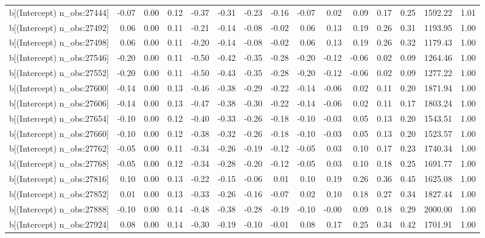 \begin{table}[ht]
\begin{tabular}{rrrrrrrrrrrrrrr}
  b[(Intercept) n\_obs:27444] & -0.07 & 0.00 & 0.12 & -0.37 & -0.31 & -0.23 & -0.16 & -0.07 & 0.02 & 0.09 & 0.17 & 0.25 & 1592.22 & 1.01 \\ 
  b[(Intercept) n\_obs:27492] & 0.06 & 0.00 & 0.11 & -0.21 & -0.14 & -0.08 & -0.02 & 0.06 & 0.13 & 0.19 & 0.26 & 0.31 & 1193.95 & 1.00 \\ 
  b[(Intercept) n\_obs:27498] & 0.06 & 0.00 & 0.11 & -0.20 & -0.14 & -0.08 & -0.02 & 0.06 & 0.13 & 0.19 & 0.26 & 0.32 & 1179.43 & 1.00 \\ 
  b[(Intercept) n\_obs:27546] & -0.20 & 0.00 & 0.11 & -0.50 & -0.42 & -0.35 & -0.28 & -0.20 & -0.12 & -0.06 & 0.02 & 0.09 & 1264.46 & 1.00 \\ 
  b[(Intercept) n\_obs:27552] & -0.20 & 0.00 & 0.11 & -0.50 & -0.43 & -0.35 & -0.28 & -0.20 & -0.12 & -0.06 & 0.02 & 0.09 & 1277.22 & 1.00 \\ 
  b[(Intercept) n\_obs:27600] & -0.14 & 0.00 & 0.13 & -0.46 & -0.38 & -0.29 & -0.22 & -0.14 & -0.06 & 0.02 & 0.11 & 0.20 & 1871.94 & 1.00 \\ 
  b[(Intercept) n\_obs:27606] & -0.14 & 0.00 & 0.13 & -0.47 & -0.38 & -0.30 & -0.22 & -0.14 & -0.06 & 0.02 & 0.11 & 0.17 & 1803.24 & 1.00 \\ 
  b[(Intercept) n\_obs:27654] & -0.10 & 0.00 & 0.12 & -0.40 & -0.33 & -0.26 & -0.18 & -0.10 & -0.03 & 0.05 & 0.13 & 0.20 & 1543.51 & 1.00 \\ 
  b[(Intercept) n\_obs:27660] & -0.10 & 0.00 & 0.12 & -0.38 & -0.32 & -0.26 & -0.18 & -0.10 & -0.03 & 0.05 & 0.13 & 0.20 & 1523.57 & 1.00 \\ 
  b[(Intercept) n\_obs:27762] & -0.05 & 0.00 & 0.11 & -0.34 & -0.26 & -0.19 & -0.12 & -0.05 & 0.03 & 0.10 & 0.17 & 0.23 & 1740.34 & 1.00 \\ 
  b[(Intercept) n\_obs:27768] & -0.05 & 0.00 & 0.12 & -0.34 & -0.28 & -0.20 & -0.12 & -0.05 & 0.03 & 0.10 & 0.18 & 0.25 & 1691.77 & 1.00 \\ 
  b[(Intercept) n\_obs:27816] & 0.10 & 0.00 & 0.13 & -0.22 & -0.15 & -0.06 & 0.01 & 0.10 & 0.19 & 0.26 & 0.36 & 0.45 & 1625.08 & 1.00 \\ 
  b[(Intercept) n\_obs:27852] & 0.01 & 0.00 & 0.13 & -0.33 & -0.26 & -0.16 & -0.07 & 0.02 & 0.10 & 0.18 & 0.27 & 0.34 & 1827.44 & 1.00 \\ 
  b[(Intercept) n\_obs:27888] & -0.10 & 0.00 & 0.14 & -0.48 & -0.38 & -0.28 & -0.19 & -0.10 & -0.00 & 0.09 & 0.18 & 0.29 & 2000.00 & 1.00 \\ 
  b[(Intercept) n\_obs:27924] & 0.08 & 0.00 & 0.14 & -0.30 & -0.19 & -0.10 & -0.01 & 0.08 & 0.17 & 0.25 & 0.34 & 0.42 & 1701.91 & 1.00 \\ 

\end{tabular}
\end{table}
